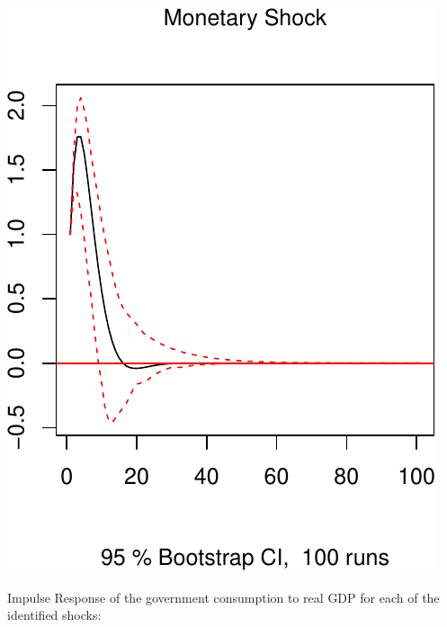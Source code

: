 \documentclass[11pt,preprint, authoryear]{elsarticle}
\numberwithin{equation}{section}
\numberwithin{figure}{section}
\numberwithin{table}{section}
\begin{document}
\includegraphics{TS_proj_files/figure-latex/unnamed-chunk-37-3.pdf}

Impulse Response of the government consumption to real GDP for each of
the identified shocks:
\end{document}
